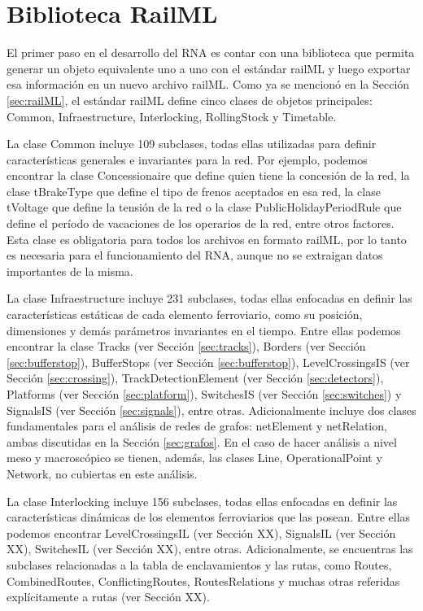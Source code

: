 \section{Biblioteca RailML}
	\label{sec:Biblioteca}
	
    El primer paso en el desarrollo del RNA es contar con una biblioteca que permita generar un objeto equivalente uno a uno con el estándar railML y luego exportar esa información en un nuevo archivo railML. Como ya se mencionó en la Sección \ref{sec:railML}, el estándar railML define cinco clases de objetos principales: Common, Infraestructure, Interlocking, RollingStock y Timetable. 

    La clase Common incluye 109 subclases, todas ellas utilizadas para definir características generales e invariantes para la red. Por ejemplo, podemos encontrar la clase Concessionaire que define quien tiene la concesión de la red, la clase tBrakeType que define el tipo de frenos aceptados en esa red, la clase tVoltage que define la tensión de la red o la clase PublicHolidayPeriodRule que define el período de vacaciones de los operarios de la red, entre otros factores. Esta clase es obligatoria para todos los archivos en formato railML, por lo tanto es necesaria para el funcionamiento del RNA, aunque no se extraigan datos importantes de la misma.

    La clase Infraestructure incluye  231 subclases, todas ellas enfocadas en definir las características estáticas de cada elemento ferroviario, como su posición, dimensiones y demás parámetros invariantes en el tiempo.  Entre ellas podemos encontrar la clase Tracks (ver Sección \ref{sec:tracks}), Borders (ver Sección \ref{sec:bufferstop}), BufferStops (ver Sección \ref{sec:bufferstop}), LevelCrossingsIS (ver Sección \ref{sec:crossing}), TrackDetectionElement (ver Sección \ref{sec:detectors}), Platforms (ver Sección \ref{sec:platform}), SwitchesIS (ver Sección \ref{sec:switches}) y SignalsIS (ver Sección \ref{sec:signals}), entre otras. Adicionalmente incluye dos clases fundamentales para el análisis de redes de grafos: netElement y netRelation, ambas discutidas en la Sección \ref{sec:grafos}. En el caso de hacer análisis a nivel meso y macroscópico se tienen, además, las clases Line, OperationalPoint y Network, no cubiertas en este análisis.

    La clase Interlocking incluye 156 subclases, todas ellas enfocadas en definir las características dinámicas de los elementos ferroviarios que las posean. Entre ellas podemos encontrar LevelCrossingsIL (ver Sección XX), SignalsIL (ver Sección XX), SwitchesIL (ver Sección XX), entre otras. Adicionalmente, se encuentras las subclases relacionadas a la tabla de enclavamientos y las rutas, como Routes, CombinedRoutes, ConflictingRoutes, RoutesRelations y muchas otras referidas explícitamente a rutas (ver Sección XX). 
    

